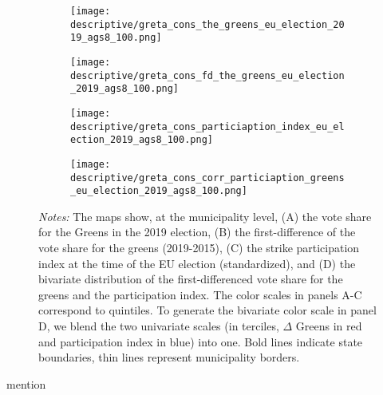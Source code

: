 \begin{figure}[H]\centering
	\caption{Spatial correlation of the vote share of the Greens and strike participation}
	\label{fig_greta_cons:spatial_correlation_greens_index}
	\begin{subfigure}[h]{0.45\linewidth}\centering
		\texttt{[image: descriptive/greta\_cons\_the\_greens\_eu\_election\_2019\_ags8\_100.png]}
	\end{subfigure}
	\begin{subfigure}[h]{0.45\linewidth}\centering
		\texttt{[image: descriptive/greta\_cons\_fd\_the\_greens\_eu\_election\_2019\_ags8\_100.png]}
	\end{subfigure}
	\begin{subfigure}[h]{0.45\linewidth}\centering
		\texttt{[image: descriptive/greta\_cons\_particiaption\_index\_eu\_election\_2019\_ags8\_100.png]}
	\end{subfigure}
	\begin{subfigure}[h]{0.45\linewidth}\centering
		\texttt{[image: descriptive/greta\_cons\_corr\_particiaption\_greens\_eu\_election\_2019\_ags8\_100.png]}
	\end{subfigure}

	\begin{minipage}{0.9\linewidth}
		\scriptsize{\emph{Notes:} The maps show, at the municipality level, (A) the vote share for the Greens in the 2019 election, (B) the first-difference of the vote share for the greens (2019-2015), (C) the strike participation index at the time of the EU election (standardized), and (D) the bivariate distribution of the first-differenced vote share for the greens and the participation index. The color scales in panels A-C correspond to quintiles. To generate the bivariate color scale in panel D, we blend the two univariate scales (in terciles, $\Delta$ Greens in red and participation index in blue) into one. Bold lines indicate state boundaries, thin lines represent municipality borders.}
	\end{minipage}
\end{figure}


mention \cite{cantoni2020persistence}


